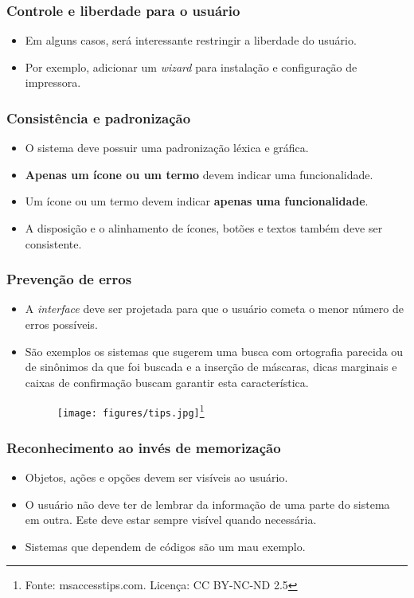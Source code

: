 \documentclass[11pt]{beamer}
\begin{document}
    \begin{frame}
      \frametitle{Controle e liberdade para o usuário}
      \begin{itemize}
        \item Em alguns casos, será interessante restringir a liberdade do usuário.
        \item Por exemplo, adicionar um \textit{wizard} para instalação e configuração de impressora.
      \end{itemize}
    \end{frame}
    
    \begin{frame}
      \frametitle{Consistência e padronização}
      \begin{itemize}
        \item O sistema deve possuir uma padronização léxica e gráfica.
        \item \textbf{Apenas um ícone ou um termo} devem indicar uma funcionalidade.
        \item Um ícone ou um termo devem indicar \textbf{apenas uma funcionalidade}.
        \item A disposição e o alinhamento de ícones, botões e textos também deve ser consistente.
      \end{itemize}
    \end{frame}

    \begin{frame}
      \frametitle{Prevenção de erros}
      \begin{itemize}
        \item A \textit{interface} deve ser projetada para que o usuário cometa o menor número de erros possíveis.
        \item São exemplos os sistemas que sugerem uma busca com ortografia parecida ou de sinônimos da que foi buscada e a inserção de máscaras, dicas marginais e caixas de confirmação buscam garantir esta característica.
        \begin{figure}[ht]
          \centering
          \texttt{[image: figures/tips.jpg]}\footnote{Fonte: msaccesstips.com. Licença: CC BY-NC-ND 2.5}
        \end{figure}
      \end{itemize}
    \end{frame}
    
    \begin{frame}
      \frametitle{Reconhecimento ao invés de memorização}
      \begin{itemize}
        \item Objetos, ações e opções devem ser visíveis ao usuário.
        \item O usuário não deve ter de lembrar da informação de uma parte do sistema em outra. Este deve estar sempre visível quando necessária.
        \item Sistemas que dependem de códigos são um mau exemplo.
      \end{itemize}
    \end{frame}
\end{document}
